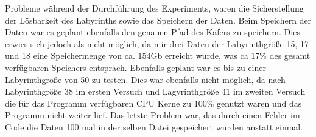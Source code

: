 \documentclass[12pt, a4paper, titlepage]{article}
\begin{document}
\bigskip

Probleme während der Durchführung des Experiments, waren die Sicherstellung der Lösbarkeit des Labyrinths sowie das Speichern der Daten.
Beim Speichern der Daten war es geplant ebenfalls den genauen Pfad des Käfers zu speichern.
Dies erwies sich jedoch als nicht möglich, da mir drei Daten der Labyrinthgröße 15, 17 und 18 eine Speichermenge von ca. 154Gb erreicht wurde, was ca 17\% des gesamt verfügbaren Speichers entsprach.
Ebenfalls geplant war es bis zu einer Labyrinthgröße von 50 zu testen.
Dies war ebenfalls nicht möglich, da nach Labyrinthgröße 38 im ersten Versuch und Lagyrinthgröße 41 im zweiten Versuch die für das Programm verfügbaren CPU Kerne zu 100\% genutzt waren und das Programm nicht weiter lief.
Das letzte Problem war, das durch einen Fehler im Code die Daten 100 mal in der selben Datei gespeichert wurden anstatt einmal.

\printbibliography 
\end{document}

